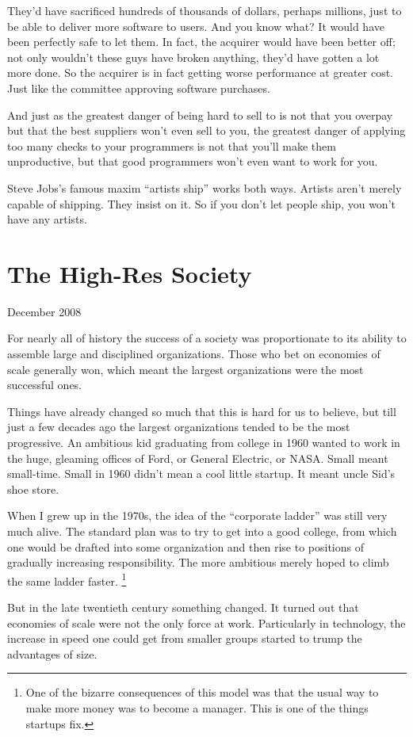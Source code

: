 \documentclass[12pt]{book}
\begin{document}
They'd have sacrificed hundreds of thousands of dollars, perhaps
millions, just to be able to deliver more software to users. And you
know what? It would have been perfectly safe to let them. In fact, the
acquirer would have been better off; not only wouldn't these guys have
broken anything, they'd have gotten a lot more done. So the acquirer is
in fact getting worse performance at greater cost. Just like the
committee approving software purchases.

And just as the greatest danger of being hard to sell to is not that you
overpay but that the best suppliers won't even sell to you, the greatest
danger of applying too many checks to your programmers is not that
you'll make them unproductive, but that good programmers won't even want
to work for you.

Steve Jobs's famous maxim ``artists ship'' works both ways. Artists
aren't merely capable of shipping. They insist on it. So if you don't
let people ship, you won't have any artists.
\chapter{The High-Res Society}

December 2008

For nearly all of history the success of a society was proportionate to
its ability to assemble large and disciplined organizations. Those who
bet on economies of scale generally won, which meant the largest
organizations were the most successful ones.

Things have already changed so much that this is hard for us to believe,
but till just a few decades ago the largest organizations tended to be
the most progressive. An ambitious kid graduating from college in 1960
wanted to work in the huge, gleaming offices of Ford, or General
Electric, or NASA. Small meant small-time. Small in 1960 didn't mean a
cool little startup. It meant uncle Sid's shoe store.

When I grew up in the 1970s, the idea of the ``corporate ladder'' was
still very much alive. The standard plan was to try to get into a good
college, from which one would be drafted into some organization and then
rise to positions of gradually increasing responsibility. The more
ambitious merely hoped to climb the same ladder faster.
\footnote{One of the bizarre consequences of this model was that the usual
way to make more money was to become a manager. This is one of the
things startups fix.}

But in the late twentieth century something changed. It turned out that
economies of scale were not the only force at work. Particularly in
technology, the increase in speed one could get from smaller groups
started to trump the advantages of size.
\end{document}
